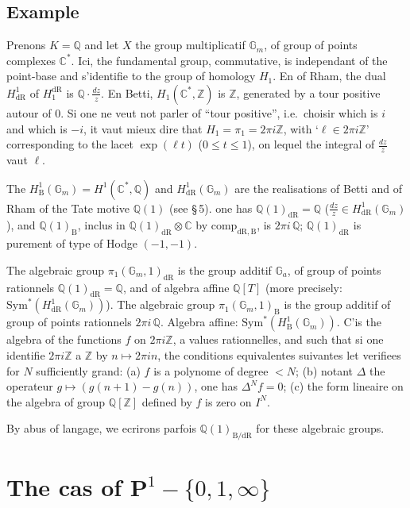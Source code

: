\documentclass[11pt,a4paper]{article}
\theoremstyle{plain}
\theoremstyle{definition}
\newcommand{\Z}{\mathbb{Z}}
\newcommand{\Q}{\mathbb{Q}}
\newcommand{\C}{\mathbb{C}}
\newcommand{\Gm}{\mathbb{G}_m}
\newcommand{\Ga}{\mathbb{G}_a}
\newcommand{\dR}{\mathrm{dR}}
\newcommand{\B}{\mathrm{B}}
\newcommand{\comp}{\mathrm{comp}}
\begin{document}
\subsection{Example}\label{ssec:2.4}

Prenons $K = \Q$ and let $X$ the group multiplicatif $\Gm$, of group of points complexes $\C^*$. Ici, the fundamental group, commutative, is independant of the point-base and s'identifie to the group of homology $H_1$. En of Rham, the dual $H_{\dR}^1$ of $H_1^{\dR}$ is $\Q \cdot \frac{dz}{z}$. En Betti, $H_1(\C^*,\Z)$ is $\Z$, generated by a tour positive autour of $0$. Si one ne veut not parler of ``tour positive'', i.e.~choisir which is $i$ and which is $-i$, it vaut mieux dire that $H_1 = \pi_1 = 2\pi i\Z$, with `$\ell \in 2\pi i\Z$' corresponding to the lacet $\exp(\ell t)$ ($0 \leq t \leq 1$), on lequel the integral of $\frac{dz}{z}$ vaut $\ell$.

The $H_{\B}^1(\Gm) = H^1(\C^*,\Q)$ and $H_{\dR}^1(\Gm)$ are the realisations of Betti and of Rham of the Tate motive $\Q(1)$ (see \S\,5). one has $\Q(1)_{\dR} = \Q$ ($\frac{dz}{z} \in H_{\dR}^1(\Gm)$), and $\Q(1)_{\B}$, inclus in $\Q(1)_{\dR} \otimes \C$ by $\comp_{\dR,\B}$, is $2\pi i\,\Q$; $\Q(1)_{\dR}$ is purement of type of Hodge $(-1,-1)$.

The algebraic group $\pi_1(\Gm,1)_{\dR}$ is the group additif $\Ga$, of group of points rationnels $\Q(1)_{\dR} = \Q$, and of algebra affine $\Q[T]$ (more precisely: $\mathrm{Sym}^*(H_{\dR}^1(\Gm))$). The algebraic group $\pi_1(\Gm,1)_{\B}$ is the group additif of group of points rationnels $2\pi i\,\Q$. Algebra affine: $\mathrm{Sym}^*(H_{\B}^1(\Gm))$. C'is the algebra of the functions $f$ on $2\pi i\Z$, a values rationnelles, and such that si one identifie $2\pi i\Z$ a $\Z$ by $n \mapsto 2\pi i n$, the conditions equivalentes suivantes let verifiees for $N$ sufficiently grand: (a) $f$ is a polynome of degree $< N$; (b) notant $\Delta$ the operateur $g \mapsto (g(n+1)-g(n))$, one has $\Delta^N f = 0$; (c) the form lineaire on the algebra of group $\Q[\Z]$ defined by $f$ is zero on $I^N$.

By abus of langage, we ecrirons parfois $\Q(1)_{\B/\dR}$ for these algebraic groups.

\section{The cas of $\mathbf{P}^1 - \{0,1,\infty\}$}\label{sec:3}

\subsection{}\label{ssec:3.1}
\end{document}
